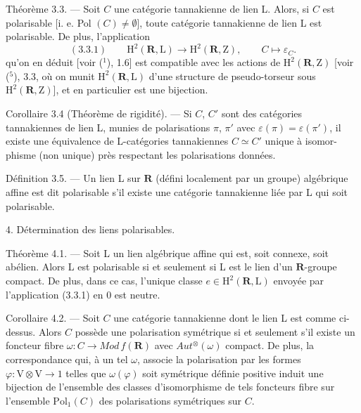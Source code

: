 
Théorème 3.3. --- Soit $C$ une catégorie tannakienne de lien L. Alors,
si $C$ est polarisable [i. e. Pol $(C) \neq \emptyset$], toute catégorie tannakienne de lien L
est polarisable. De plus, l'application
\[ (3.3.1) \qquad \mathrm{H}^2(\mathbf{R}, \mathrm{L}) \rightarrow \mathrm{H}^2(\mathbf{R}, \mathrm{Z}), \qquad C \mapsto \varepsilon_C. \]
qu'on en déduit [voir ($^1$), 1.6] est compatible avec les actions de $\mathrm{H}^2(\mathbf{R}, \mathrm{Z})$
[voir ($^5$), 3.3, où on munit $\mathrm{H}^2(\mathbf{R}, \mathrm{L})$ d'une structure de pseudo-torseur
sous $\mathrm{H}^2(\mathbf{R}, \mathrm{Z})$], et en particulier est une bijection.

Corollaire 3.4 (Théorème de rigidité). --- Si $C$, $C'$ sont des catégories
tannakiennes de lien L, munies de polarisations $\pi$, $\pi'$ avec $\varepsilon(\pi) = \varepsilon(\pi')$,
il existe une équivalence de L-catégories tannakiennes $C \simeq C'$ unique à isomor-%
phisme (non unique) près respectant les polarisations données.

Définition 3.5. --- Un lien L sur $\mathbf{R}$ (défini localement par un groupe)
algébrique affine est dit polarisable s'il existe une catégorie tannakienne
liée par L qui soit polarisable.

4. Détermination des liens polarisables.

Théorème 4.1. --- Soit L un lien algébrique affine qui est, soit connexe,
soit abélien. Alors L est polarisable si et seulement si L est le lien d'un
$\mathbf{R}$-groupe compact. De plus, dans ce cas, l'unique classe $e \in \mathrm{H}^2(\mathbf{R}, \mathrm{L})$ envoyée
par l'application (3.3.1) en 0 est neutre.

Corollaire 4.2. --- Soit $C$ une catégorie tannakienne dont le lien L est
comme ci-dessus. Alors $C$ possède une polarisation symétrique si et seulement
s'il existe un foncteur fibre $\omega : C \rightarrow Mod\,f(\mathbf{R})$ avec $Aut^{\otimes}(\omega)$ compact.
De plus, la correspondance qui, à un tel $\omega$, associe la polarisation par les
formes $\varphi : \mathrm{V} \otimes \mathrm{V} \rightarrow 1$ telles que $\omega(\varphi)$ soit symétrique définie positive induit
une bijection de l'ensemble des classes d'isomorphisme de tels foncteurs fibre
sur l'ensemble $\mathrm{Pol}_1(C)$ des polarisations symétriques sur $C$.

